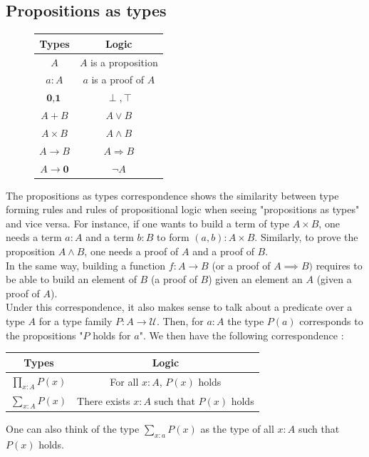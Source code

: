 \documentclass{report}
\begin{document}
\subsection{Propositions as types}
\begin{figure}[h]
\begin{center}
\begin{tabular}{|c|c|}
\hline Types & Logic  \\
\hline$A$ & $A$ is a proposition  \\
\hline$a: A$ & $a$ is a proof of $A$ \\
\hline $\textbf{0},\textbf{1}$ & $\perp, \top$ \\
\hline$A+B$ & $A \vee B$  \\
\hline$A \times B$ & $A \wedge B$  \\
\hline$A \rightarrow B$ & $A \Rightarrow B$ \\
\hline$A \rightarrow \textbf{0}$ & $\lnot A$ \\
\hline
\end{tabular}
\end{center}
\end{figure}
The propositions as types correspondence shows the similarity between type forming rules and rules of propositional logic when seeing "propositions as types" and vice versa. For instance, if one wants to build a term of type $A \times B$, one needs a term $a : A$ and a term $b : B$ to form $(a,b) : A \times B$. Similarly, to prove the proposition $A \land B$, one needs a proof of $A$ and a proof of $B$. \\
In the same way, building a function $f : A \rightarrow B$ (or a proof of $A \implies B)$ requires to be able to build an element of $B$ (a proof of $B$) given an element an $A$ (given a proof of $A$).\\
Under this correspondence, it also makes sense to talk about a predicate over a type $A$ for a type family $P : A \rightarrow \mathcal{U}$. Then, for $a :A$ the type $P(a)$ corresponds to the propositions "$P$ holds for $a$". We then have the following correspondence : 
\begin{center}
  \begin{tabular}{|c|c|}
  \hline Types & Logic  \\
  \hline$\prod_{x : A} P(x)$ & For all $x :A$, $P(x)$ holds  \\
  \hline$\sum_{x : A} P(x)$ & There exists $x : A$ such that $P(x)$ holds\\
  \hline
  \end{tabular}
\end{center} 
One can also think of the type $\sum_{x: a} P(x)$ as the type of all $x : A$ such that $P(x)$ holds.
\end{document}
